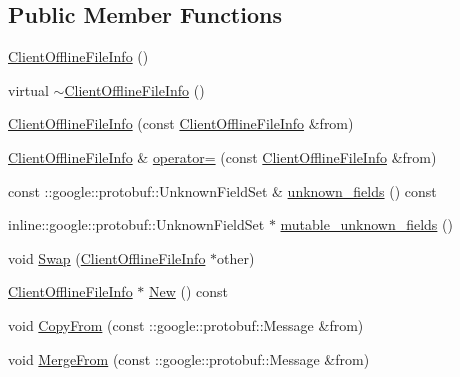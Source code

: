 \subsection*{Public Member Functions}
\begin{DoxyCompactItemize}
\item 
\hyperlink{class_i_m_1_1_base_define_1_1_client_offline_file_info_a160526401354c93ab35de242a3f3f38e}{Client\+Offline\+File\+Info} ()
\item 
virtual \hyperlink{class_i_m_1_1_base_define_1_1_client_offline_file_info_aecef75a2dabba4f53fe900b8c92e6106}{$\sim$\+Client\+Offline\+File\+Info} ()
\item 
\hyperlink{class_i_m_1_1_base_define_1_1_client_offline_file_info_a2d0454955fe2a3620f38f03c22b72263}{Client\+Offline\+File\+Info} (const \hyperlink{class_i_m_1_1_base_define_1_1_client_offline_file_info}{Client\+Offline\+File\+Info} \&from)
\item 
\hyperlink{class_i_m_1_1_base_define_1_1_client_offline_file_info}{Client\+Offline\+File\+Info} \& \hyperlink{class_i_m_1_1_base_define_1_1_client_offline_file_info_a411e4f5e568609fc1f0b0724091657b0}{operator=} (const \hyperlink{class_i_m_1_1_base_define_1_1_client_offline_file_info}{Client\+Offline\+File\+Info} \&from)
\item 
const \+::google\+::protobuf\+::\+Unknown\+Field\+Set \& \hyperlink{class_i_m_1_1_base_define_1_1_client_offline_file_info_a0bb181b60d549790303bbf8cbb897619}{unknown\+\_\+fields} () const 
\item 
inline\+::google\+::protobuf\+::\+Unknown\+Field\+Set $\ast$ \hyperlink{class_i_m_1_1_base_define_1_1_client_offline_file_info_a56fb9ca1b06e88a52878252792751fcd}{mutable\+\_\+unknown\+\_\+fields} ()
\item 
void \hyperlink{class_i_m_1_1_base_define_1_1_client_offline_file_info_a606096bc14f27c2edcabcc55be64675f}{Swap} (\hyperlink{class_i_m_1_1_base_define_1_1_client_offline_file_info}{Client\+Offline\+File\+Info} $\ast$other)
\item 
\hyperlink{class_i_m_1_1_base_define_1_1_client_offline_file_info}{Client\+Offline\+File\+Info} $\ast$ \hyperlink{class_i_m_1_1_base_define_1_1_client_offline_file_info_a0f335bd4f4d4f4c19a6ad511696f1101}{New} () const 
\item 
void \hyperlink{class_i_m_1_1_base_define_1_1_client_offline_file_info_a90faa4d9327d027923454d7c275eba6b}{Copy\+From} (const \+::google\+::protobuf\+::\+Message \&from)
\item 
void \hyperlink{class_i_m_1_1_base_define_1_1_client_offline_file_info_aa66e0cd755700c6e65598955cb1dcdda}{Merge\+From} (const \+::google\+::protobuf\+::\+Message \&from)

\end{DoxyCompactItemize}

